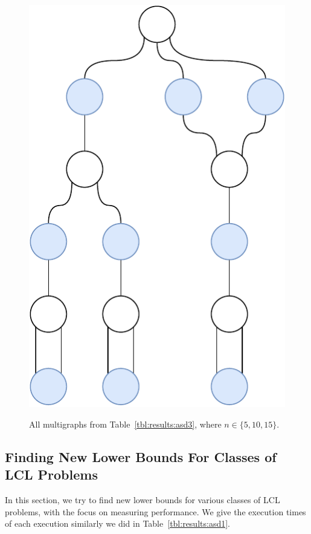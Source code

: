 \begin{figure}[H]
{    }
    \hfill
       {
      \centering
      \includegraphics[scale=0.4]{diagrams/results_multigraph_n15_12.pdf}
    }
    \caption{All multigraphs from Table~\ref{tbl:results:asd3}, where $n \in \{5,10,15\}.$}
    \label{fig:results:graphs}
  \end{figure}


\subsection{Finding New Lower Bounds For Classes of LCL Problems} \label{sec:results:classifying_large_classes}
In this section, we try to find new lower bounds for various classes of LCL problems, with the focus on measuring performance.
We give the execution times of each execution similarly we did in Table~\ref{tbl:results:asd1}.


